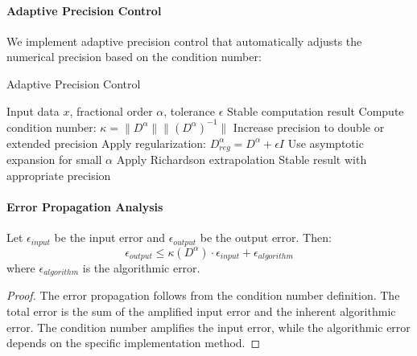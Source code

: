 \paragraph{Adaptive Precision Control}

We implement adaptive precision control that automatically adjusts the numerical precision based on the condition number:

\begin{algorithm}[h]
\caption{Adaptive Precision Control}
\begin{algorithmic}[1]
\Require Input data $x$, fractional order $\alpha$, tolerance $\epsilon$
\Ensure Stable computation result
\State Compute condition number: $\kappa = \|D^{\alpha}\| \|(D^{\alpha})^{-1}\|$
    \State Increase precision to double or extended precision
    \State Apply regularization: $D^{\alpha}_{reg} = D^{\alpha} + \epsilon I$
\EndIf
{}
    \State Use asymptotic expansion for small $\alpha$
    \State Apply Richardson extrapolation
\EndIf
\Return Stable result with appropriate precision
\end{algorithmic}
\end{algorithm}

\paragraph{Error Propagation Analysis}

\begin{theorem}
Let $\epsilon_{input}$ be the input error and $\epsilon_{output}$ be the output error. Then:
\begin{equation}
\epsilon_{output} \leq \kappa(D^{\alpha}) \cdot \epsilon_{input} + \epsilon_{algorithm}
\end{equation}
where $\epsilon_{algorithm}$ is the algorithmic error.
\end{theorem}

\begin{proof}
The error propagation follows from the condition number definition. The total error is the sum of the amplified input error and the inherent algorithmic error. The condition number amplifies the input error, while the algorithmic error depends on the specific implementation method.
\end{proof}
